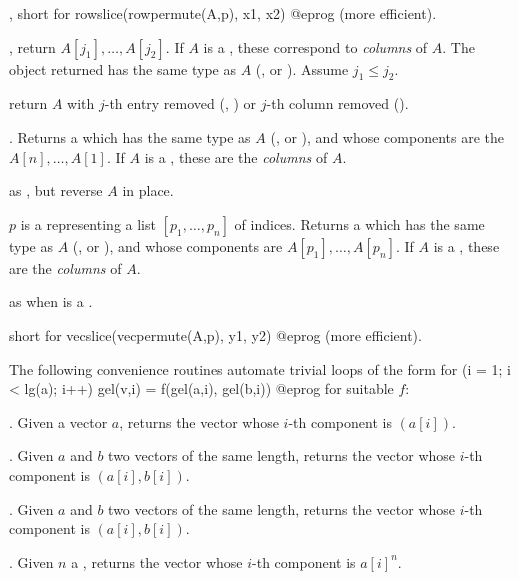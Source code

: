 , short for
\bprog
  rowslice(rowpermute(A,p), x1, x2)
@eprog\noindent
(more efficient).

, return $A[j_1], \dots,
A[j_2]$. If $A$ is a , these correspond to \emph{columns} of $A$.
The object returned has the same type as $A$ (,  or
). Assume $j_1 \leq j_2$.

 return $A$ with $j$-th entry removed
(, ) or $j$-th column removed ().

. Returns a  which has the same
type as $A$ (,  or ), and whose components
are the $A[n],\dots,A[1]$. If $A$ is a , these are the
\emph{columns} of $A$.

 as , but reverse
$A$ in place.

 $p$ is a  representing
a list $[p_1,\dots,p_n]$ of indices. Returns a  which has the same
type as $A$ (,  or ), and whose components
are $A[p_1],\dots,A[p_n]$. If $A$ is a , these are the
\emph{columns} of $A$.

 as  when  is a
.

 short for
\bprog
  vecslice(vecpermute(A,p), y1, y2)
@eprog\noindent
(more efficient).


The following convenience routines automate trivial loops of the form
\bprog
  for (i = 1; i < lg(a); i++) gel(v,i) = f(gel(a,i), gel(b,i))
@eprog\noindent
for suitable $f$:

. Given a vector $a$,
returns the vector whose $i$-th component is $(a[i])$.

. Given $a$ and $b$ two vectors of the same
length, returns the vector whose $i$-th component is $(a[i], b[i])$.

. Given $a$ and $b$ two vectors of the same
length, returns the vector whose $i$-th component is $(a[i], b[i])$.

. Given $n$ a , returns
the vector whose $i$-th component is $a[i]^n$.

